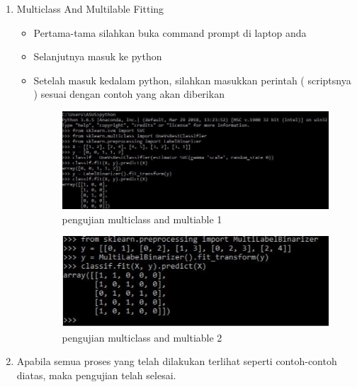 \begin{enumerate}
\begin{itemize}
\begin{enumerate}
\begin{itemize}
\par
\end{itemize}
\par
\item Multiclass And Multilable Fitting
\begin{itemize}
\item Pertama-tama silahkan buka command prompt di laptop anda
\item Selanjutnya masuk ke python 
\item Setelah masuk kedalam python, silahkan masukkan perintah ( scriptsnya ) sesuai dengan contoh yang akan diberikan
\par

\begin{figure}[ht]
\centering
\includegraphics[scale=0.4]{figures/multiclass1.jpg}
\caption{pengujian multiclass and multiable 1 }
\label{contoh}
\end{figure}

\par
\par

\begin{figure}[ht]
\centering
\includegraphics[scale=0.5]{figures/multiclass2.jpg}
\caption{pengujian multiclass and multiable 2 }
\label{contoh}
\end{figure}

\par
\end{itemize}

\item Apabila semua proses yang telah dilakukan terlihat seperti contoh-contoh diatas, maka pengujian telah selesai.
\end{enumerate}


\end{itemize}
\end{enumerate}
